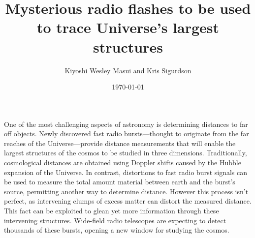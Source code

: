 \documentclass{article}
\title{Mysterious radio flashes to be used to trace Universe's largest
structures}
\date{\today}
\author{Kiyoshi Wesley Masui and Kris Sigurdson}
\begin{document}
\maketitle

One of the most challenging aspects of astronomy is determining distances to
far off objects. Newly discovered fast radio bursts---thought to originate from
the far reaches of the Universe---provide distance measurements that will
enable the largest structures of the cosmos to be studied in three dimensions.
Traditionally, cosmological distances are obtained using Doppler shifts caused
by the Hubble expansion of the Universe. In contrast, distortions to fast radio
burst signals can be used to measure the total amount material between earth
and the burst's source, permitting another way to determine distance.  However
this process isn't perfect, as intervening clumps of excess matter can distort the
measured distance. This fact can be exploited to glean yet more
information through these intervening structures.  Wide-field radio telescopes
are expecting to detect thousands of these bursts, opening a new window for
studying the cosmos.
\end{document}
